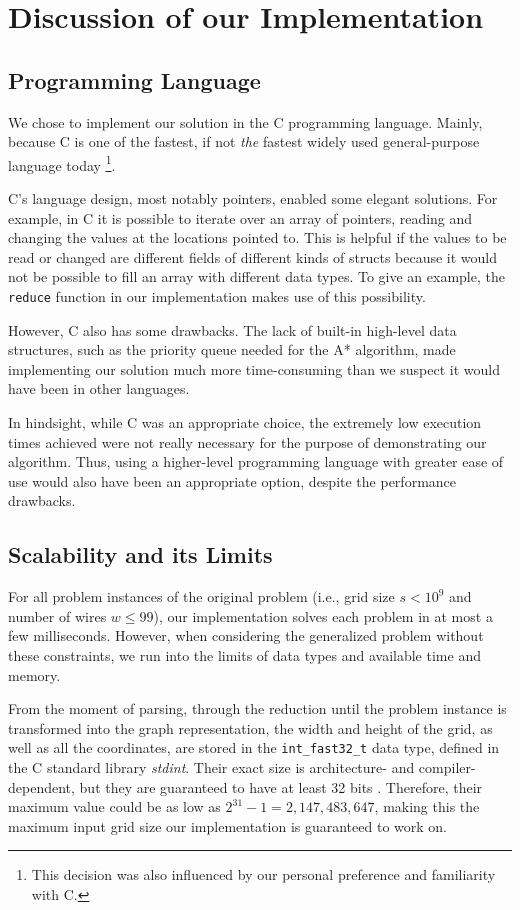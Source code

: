 \documentclass[sigconf,nonacm,screen]{acmart}
\begin{document}
\section{Discussion of our Implementation}

\subsection{Programming Language}
We chose to implement our solution in the C programming language. Mainly, because C is one of the fastest, if not \emph{the} fastest widely used general-purpose language today \cite{10.1145/3125374.3125382}\cite{Fourment2008}\cite{PEREIRA2021102609}\footnote{This decision was also influenced by our personal preference and familiarity with C.}.

C's language design, most notably pointers, enabled some elegant solutions. For example, in C it is possible to iterate over an array of pointers, reading and changing the values at the locations pointed to. This is helpful if the values to be read or changed are different fields of different kinds of structs because it would not be possible to fill an array with different data types. To give an example, the \texttt{reduce} function in our implementation makes use of this possibility.

However, C also has some drawbacks. The lack of built-in high-level data structures, such as the priority queue needed for the A* algorithm, made implementing our solution much more time-consuming than we suspect it would have been in other languages.

In hindsight, while C was an appropriate choice, the extremely low execution times achieved were not really necessary for the purpose of demonstrating our algorithm. Thus, using a higher-level programming language with greater ease of use would also have been an appropriate option, despite the performance drawbacks.

\subsection{Scalability and its Limits}
For all problem instances of the original problem (i.e., grid size $s<10^{9}$ and number of wires $w\leq99$), our implementation solves each problem in at most a few milliseconds. However, when considering the generalized problem without these constraints, we run into the limits of data types and available time and memory. 

From the moment of parsing, through the reduction until the problem instance is transformed into the graph representation, the width and height of the grid, as well as all the coordinates, are stored in the \texttt{int\_fast32\_t} data type, defined in the C standard library \emph{stdint}. Their exact size is architecture- and compiler-dependent, but they are guaranteed to have at least 32 bits \cite{isoiec_C99}. Therefore, their maximum value could be as low as $2^{31}-1=2,147,483,647$, making this the maximum input grid size our implementation is guaranteed to work on.
\end{document}
